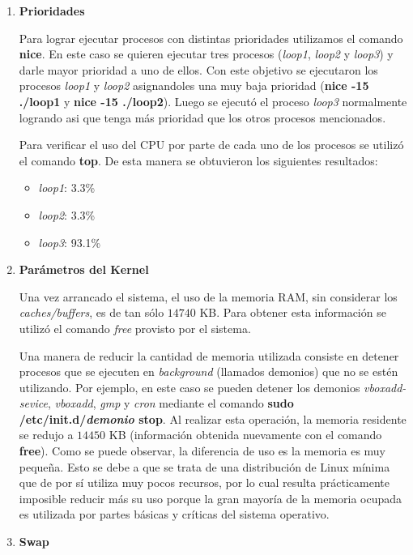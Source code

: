 \documentclass[a4paper,11pt] {article}
\begin{document}
\begin{enumerate}
  \item \textbf{Prioridades}

    Para lograr ejecutar procesos con distintas prioridades utilizamos el comando \textbf{nice}. En este caso se quieren ejecutar tres procesos (\textit{loop1}, \textit{loop2} y \textit{loop3}) y darle mayor prioridad a uno de ellos. Con este objetivo se ejecutaron los procesos \textit{loop1} y \textit{loop2} asignandoles una muy baja prioridad (\textbf{nice -15 ./loop1} y \textbf{nice -15 ./loop2}). Luego se ejecut\'o el proceso \textit{loop3} normalmente logrando asi que tenga m\'as prioridad que los otros procesos mencionados.

    Para verificar el uso del CPU por parte de cada uno de los procesos se utiliz\'o el comando \textbf{top}. De esta manera se obtuvieron los siguientes resultados:
    \begin{itemize}
      \item \textit{loop1}: 3.3\%
      \item \textit{loop2}: 3.3\%
      \item \textit{loop3}: 93.1\%
    \end{itemize}

  \item \textbf{Parámetros del Kernel}

	Una vez arrancado el sistema, el uso de la memoria RAM, sin considerar los \textit{caches/buffers}, es de tan sólo $14740$ KB. Para obtener esta información se utilizó el comando \textit{free} provisto por el sistema. 

	Una manera de reducir la cantidad de memoria utilizada consiste en detener procesos que se ejecuten en \textit{background} (llamados demonios) que no se estén utilizando. Por ejemplo, en este caso se pueden detener los demonios \textit{vboxadd-sevice}, \textit{vboxadd}, \textit{gmp} y \textit{cron} mediante el comando \textbf{sudo /etc/init.d/\textit{demonio} stop}. Al realizar esta operación, la memoria residente se redujo a $14450$ KB (información obtenida nuevamente con el comando \textbf{free}). Como se puede observar, la diferencia de uso es la memoria es muy pequeña. Esto se debe a que se trata de una distribución de Linux mínima que de por sí utiliza muy pocos recursos, por lo cual resulta prácticamente imposible reducir más su uso porque la gran mayoría de la memoria ocupada es utilizada por partes básicas y críticas del sistema operativo.

  \item \textbf{Swap}


\end{enumerate}
\end{document}
